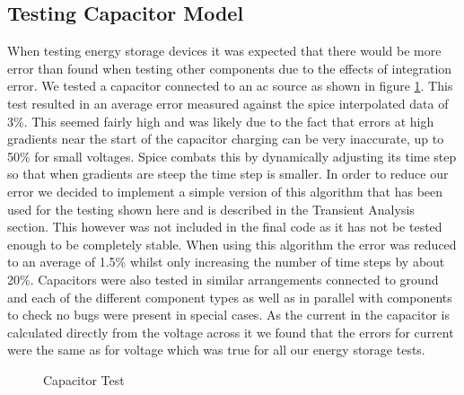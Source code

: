 \documentclass{article}
\begin{document}
\subsection{Testing Capacitor Model}
When testing energy storage devices it was expected that there would be more error than found when testing other components due to the effects of integration error. We tested a capacitor connected to an ac source as shown in figure \ref{fig:CapTest}. This test resulted in an average error measured against the spice interpolated data of 3\%. This seemed fairly high and was likely due to the fact that errors at high gradients near the start of the capacitor charging can be very inaccurate, up to 50\% for small voltages. Spice combats this by dynamically adjusting its time step so that when gradients are steep the time step is smaller. In order to reduce our error we decided to implement a simple version of this algorithm that has been used for the testing shown here and is described in the Transient Analysis section. This however was not included in the final code as it has not be tested enough to be completely stable. When using this algorithm the error was reduced to an average of 1.5\% whilst only increasing the number of time steps by about 20\%. Capacitors were also tested in similar arrangements connected to ground and each of the different component types as well as in parallel with components to check no bugs were present in special cases. As the current in the capacitor is calculated directly from the voltage across it we found that the errors for current were the same as for voltage which was true for all our energy storage tests.
\begin{figure}[h]%
    \centering
    \qquad
    \caption{Capacitor Test}%
    \label{fig:CapTest}%
\end{figure}
\newpage
\end{document}

